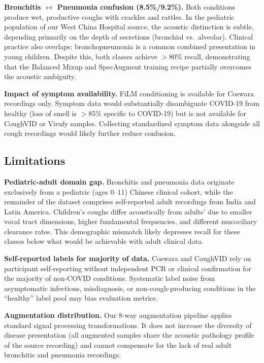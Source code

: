 \documentclass[10pt,journal,compsoc]{IEEEtran}
\begin{document}
\textbf{Bronchitis $\leftrightarrow$ Pneumonia confusion (8.5\%/9.2\%).}
Both conditions produce wet, productive coughs with crackles and rattles.
In the pediatric population of our West China Hospital source, the
acoustic distinction is subtle, depending primarily on the depth of
secretions (bronchial vs.\ alveolar). Clinical practice also overlaps:
bronchopneumonia is a common combined presentation in young children.
Despite this, both classes achieve $>$80\% recall, demonstrating that the
Balanced Mixup and SpecAugment training recipe partially overcomes the
acoustic ambiguity.

\textbf{Impact of symptom availability.}
FiLM conditioning is available for Coswara recordings only.
Symptom data would substantially disambiguate COVID-19 from healthy
(loss of smell is $>$85\% specific to COVID-19) but is not available
for CoughVID or Virufy samples. Collecting standardized symptom data
alongside all cough recordings would likely further reduce confusion.

\subsection{Limitations}

\textbf{Pediatric-adult domain gap.}
Bronchitis and pneumonia data originate exclusively from a pediatric
(ages 0--11) Chinese clinical cohort, while the remainder of the dataset
comprises self-reported adult recordings from India and Latin America.
Children's coughs differ acoustically from adults' due to smaller vocal
tract dimensions, higher fundamental frequencies, and different
mucociliary clearance rates. This demographic mismatch likely depresses
recall for these classes below what would be achievable with adult
clinical data.

\textbf{Self-reported labels for majority of data.}
Coswara and CoughVID rely on participant self-reporting without independent
PCR or clinical confirmation for the majority of non-COVID conditions.
Systematic label noise from asymptomatic infections, misdiagnosis, or
non-cough-producing conditions in the ``healthy'' label pool may bias
evaluation metrics.

\textbf{Augmentation distribution.}
Our 8-way augmentation pipeline applies standard signal processing
transformations. It does not increase the diversity of disease presentation
(all augmented samples share the acoustic pathology profile of the source
recording) and cannot compensate for the lack of real adult bronchitis
and pneumonia recordings.
\end{document}
